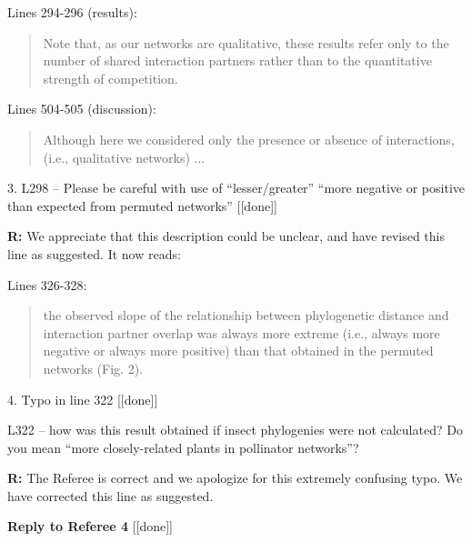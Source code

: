 \documentclass[12pt]{letter}
\newenvironment{refquote}{\bigskip \begin{it}}{\end{it}\smallskip}
\begin{document}
		Lines 294-296 (results):
		
		\begin{quotation}

			Note that, as our networks 
		    are qualitative, these results refer only to the number of shared interaction
	    	partners rather than to the quantitative strength of competition.

    	\end{quotation}


    	Lines 504-505 (discussion):

    	\begin{quotation}

		  Although here we considered only the presence or absence of interactions,
		  (i.e., qualitative networks) ...

    	\end{quotation}


	3. L298 – Please be careful with use of “lesser/greater” “more negative or positive than expected from permuted networks” [[done]]

		\textbf{R:} We appreciate that this description could be unclear, and have revised this line as suggested. It now reads:

		Lines 326-328:

		\begin{quotation}

			the observed 
			slope of the relationship between phylogenetic distance and interaction 
			partner overlap was always more extreme (i.e., always more negative or 
			always more positive) than that obtained in the permuted networks (Fig. 2).

	    \end{quotation}


	4. Typo in line 322 [[done]]
		
		\begin{refquote}
			L322 – how was this result obtained if insect phylogenies were not calculated? Do you mean “more closely-related plants in pollinator networks”?
		\end{refquote}


		\textbf{R:} The Referee is correct and we apologize for this extremely confusing typo. We have corrected this line as suggested.


\clearpage


{\Large \bf Reply to Referee 4} [[done]]
\end{document}
